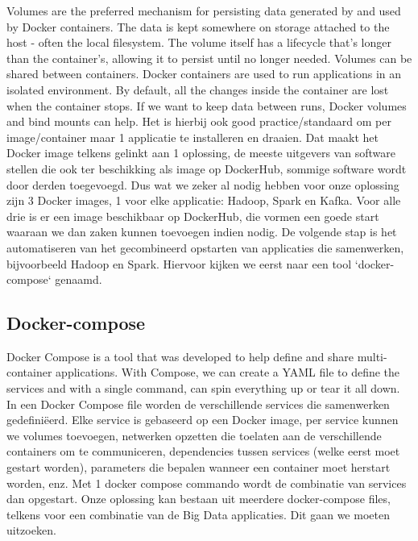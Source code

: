 Volumes are the preferred mechanism for persisting data generated by and used by Docker containers.
The data is kept somewhere on storage attached to the host - often the local filesystem. The volume itself has a lifecycle that's longer than the container's, allowing it to persist until no longer needed. Volumes can be shared between containers. \autocite{Javatpoint2023}
\newline
\newline
Docker containers are used to run applications in an isolated environment. By default, all the changes inside the container are lost when the container stops. If we want to keep data between runs, Docker volumes and bind mounts can help. \autocite{Frieze2022}
\newline
\newline
Het is hierbij ook good practice/standaard om per image/container maar 1 applicatie te installeren en draaien. Dat maakt het Docker image telkens gelinkt aan 1 oplossing, de meeste uitgevers van software stellen die ook ter beschikking als image op DockerHub, sommige software wordt door derden toegevoegd.
\newline
\newline
Dus wat we zeker al nodig hebben voor onze oplossing zijn 3 Docker images, 1 voor elke applicatie: Hadoop, Spark en Kafka. Voor alle drie is er een image beschikbaar op DockerHub, die vormen een goede start waaraan we dan zaken kunnen toevoegen indien nodig.
\newline
\newline
De volgende stap is het automatiseren van het gecombineerd opstarten van applicaties die samenwerken, bijvoorbeeld Hadoop en Spark. Hiervoor kijken we eerst naar een tool `docker-compose` genaamd.

\subsection{Docker-compose}
Docker Compose is a tool that was developed to help define and share multi-container applications. With Compose, we can create a YAML file to define the services and with a single command, can spin everything up or tear it all down. \autocite{Docker2023}
\newline
\newline
In een Docker Compose file worden de verschillende services die samenwerken gedefiniëerd. Elke service is gebaseerd op een Docker image, per service kunnen we volumes toevoegen, netwerken opzetten die toelaten aan de verschillende containers om te communiceren, dependencies tussen services (welke eerst moet gestart worden), parameters die bepalen wanneer een container moet herstart worden, enz.
\newline
\newline
Met 1 docker compose commando wordt de combinatie van services dan opgestart.
\newline
\newline
Onze oplossing kan bestaan uit meerdere docker-compose files, telkens voor een combinatie van de Big Data applicaties. Dit gaan we moeten uitzoeken.
\newline
\newline

